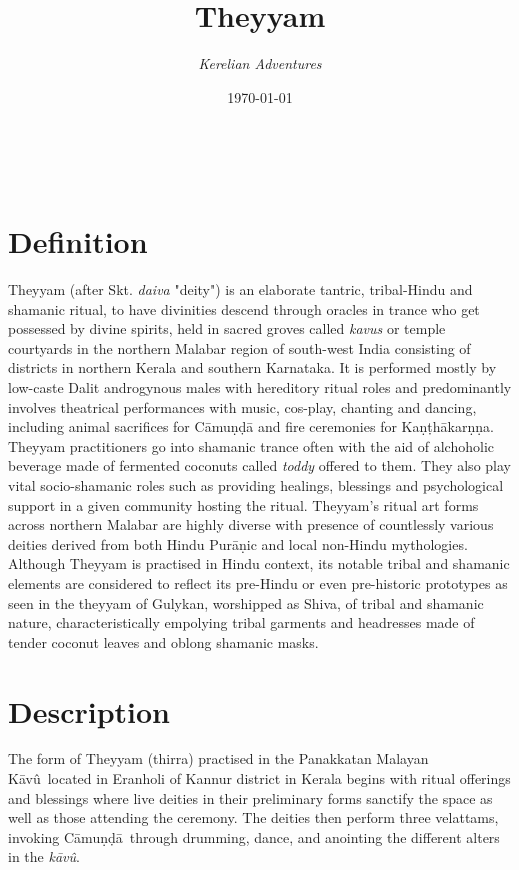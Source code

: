 \documentclass[a4paper, 11pt]{article} %
\title{\textbf{Theyyam}} %
\author{\textit{Kerelian Adventures}} %
\date{\today} %
\makeatletter
\newcommand{\camunda}[0]{C\={a}mu\d{n}\d{d}\={a}}
\newcommand{\kavu}[0]{\textit{k\={a}v\^{u}}}
\newcommand{\Kavu}[0]{K\={a}v\^{u}}
\renewcommand{\maketitle}{ %
\begin{flushright} %
{\LARGE\@title} %

\vspace{10pt} %

{\@author} %
\\\@date %

\vspace{30pt} %
\end{flushright}
}
\makeatother
\begin{document}
\maketitle %

\thispagestyle{empty}


\section{Definition}
  \label{sec:Definition}

Theyyam (after Skt. \textit{daiva} "deity") is an elaborate tantric, tribal-Hindu and shamanic ritual, to have divinities descend through oracles in trance who get possessed by divine spirits, held in sacred groves called \textit{kavus} or temple courtyards in the northern Malabar region of south-west India consisting of districts in northern Kerala and southern Karnataka. It is performed mostly by low-caste Dalit androgynous males with hereditory ritual roles and predominantly involves theatrical performances with music, cos-play, chanting and dancing, including animal sacrifices for Cāmuṇḍā and fire ceremonies for Kaṇṭhākarṇṇa. Theyyam practitioners go into shamanic trance often with the aid of alchoholic beverage made of fermented coconuts called \textit{toddy} offered to them. They also play vital socio-shamanic roles such as providing healings, blessings and psychological support in a given community hosting the ritual. Theyyam's ritual art forms across northern Malabar are highly diverse with presence of countlessly various deities derived from both Hindu Purāṇic and local non-Hindu mythologies. Although Theyyam is practised in Hindu context, its notable tribal and shamanic elements are considered to reflect its pre-Hindu or even pre-historic prototypes as seen in the theyyam of Gulykan, worshipped as Shiva, of tribal and shamanic nature, characteristically empolying tribal garments and headresses made of tender coconut leaves and oblong shamanic masks.

\section{Description}%
  \label{sec:Description}
  
The form of Theyyam (thirra) practised in the Panakkatan Malayan \Kavu\ located in Eranholi of Kannur district in Kerala begins with ritual offerings and blessings where live deities in their preliminary forms sanctify the space as well as those attending the ceremony.
The deities then perform three velattams, invoking \camunda\ through drumming, dance, and anointing the different alters in the \kavu.
\end{document}
